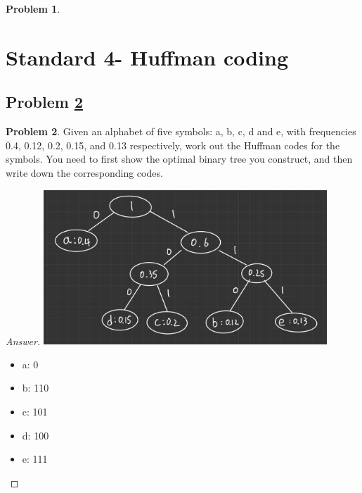 \documentclass[11pt]{article}
\theoremstyle{definition}
\theoremstyle{definition}
\newtheorem{required}{Problem}
\theoremstyle{definition}
\begin{document}
\begin{required}
\begin{enumerate}[label=(\alph*)]
\end{enumerate}
\end{required}

\newpage
\section{Standard 4- Huffman coding}
\subsection{Problem \ref{Huffman}}
\begin{required} \label{Huffman}
Given an alphabet of five symbols: a, b, c, d and e, with frequencies 0.4, 0.12, 0.2, 0.15, and 0.13
respectively, work out the Huffman codes for the symbols. You need to first show the optimal binary tree you construct, and then write down the corresponding codes. \\
\end{required}



\begin{proof}[Answer]
\includegraphics[width=0.8\textwidth]{Problem9.PNG}
\begin{itemize}
\item a: 0
\item b: 110
\item c: 101
\item d: 100
\item e: 111
\end{itemize}
\end{proof}



\end{document}
